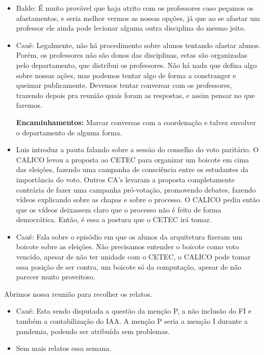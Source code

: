 \documentclass{ata-calico}
\begin{document}
\begin{itemize}
\item Balde: É muito provável que haja atrito com os professores caso peçamos os afastamentos, e seria melhor vermos as nossas opções, já que ao se afastar um professor ele ainda pode lecionar alguma outra disciplina do mesmo jeito.

\item Cauê: Legalmente, não há procedimento sobre alunos tentando afastar alunos. Porém, os professores não são donos das disciplinas, estas são organizadas pelo departamento, que distribui os professores. Não há nada que defina algo sobre nossas ações, mas podemos tentar algo de forma a constranger e queimar publicamente. Devemos tentar conversar com os professores, trazendo depois pra reunião quais foram as respostas, e assim pensar no que faremos.\newline

\textbf{Encaminhamentos:} Marcar conversas com a coordenação e talvez envolver o departamento de alguma forma.

\end{itemize}

\begin{itemize}
\item Luis introduz a pauta falando sobre a sessão do conselho do voto paritário. O CALICO levou a proposta ao CETEC para organizar um boicote em cima das eleições, fazendo uma campanha de consciência entre os estudantes da importância do voto. Outros CA's levaram a proposta completamente contrária de fazer uma campanha pró-votação, promovendo debates, fazendo vídeos explicando sobre as chapas e sobre o processo. O CALICO pediu então que os vídeos deixassem claro que o processo não é feito de forma democrática. Então, é essa a postura que o CETEC irá tomar.

\item Cauê: Fala sobre o episódio em que os alunos da arquitetura fizeram um boicote sobre as eleições. Não precisamos entender o boicote como voto vencido, apesar de não ter unidade com o CETEC, o CALICO pode tomar essa posição de ser contra, um boicote só da computação, apesar de não parecer muito proveitoso. 
\end{itemize}

Abrimos nossa reunião para recolher os relatos.

\begin{itemize}
\item Cauê: Esta sendo disputada a questão da menção P, a não inclusão do FI e também a contabilização do IAA. A menção P seria a menção I durante a pandemia, podendo ser atribuída sem problemas.

\item Sem mais relatos essa semana.
\end{itemize}

\end{document}
